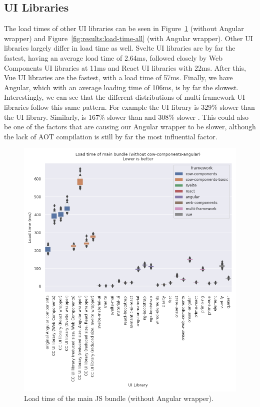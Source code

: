 \subsection{UI Libraries}
The load times of other UI libraries can be seen in Figure~\ref{fig:results:load-time-all-no-angular} (without Angular wrapper) and Figure~\ref{fig:results:load-time-all} (with Angular wrapper). Other UI libraries largely differ in load time as well. Svelte UI libraries are by far the fastest, having an average load time of 2.64ms, followed closely by Web Components UI libraries at 11ms and React UI libraries with 22ms. After this, Vue UI libraries are the fastest, with a load time of 57ms. Finally, we have Angular, which with an average loading time of 106ms, is by far the slowest. Interestingly, we can see that the different distributions of multi-framework UI libraries follow this same pattern. For example the  UI library is 329\% slower than the  UI library. Similarly,  is 167\% slower than  and 308\% slower . This could also be one of the factors that are causing our Angular wrapper to be slower, although the lack of AOT compilation is still by far the most influential factor.

\begin{figure}[h]
  \includegraphics[width=\columnwidth]{plots/load-time-all-no-angular.png}
  \caption{Load time of the main JS bundle (without Angular wrapper).}
  \label{fig:results:load-time-all-no-angular}
  \centering
\end{figure}

